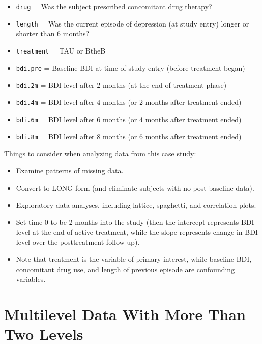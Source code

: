 \documentclass[
]{krantz}
\providecommand{\tightlist}{%
  \setlength{\itemsep}{0pt}\setlength{\parskip}{0pt}}
\begin{document}
\begin{enumerate}
  \begin{itemize}
  \tightlist
  \item
    \texttt{drug} = Was the subject prescribed concomitant drug therapy?
  \item
    \texttt{length} = Was the current episode of depression (at study entry) longer or shorter than 6 months?
  \item
    \texttt{treatment} = TAU or BtheB
  \item
    \texttt{bdi.pre} = Baseline BDI at time of study entry (before treatment began)
  \item
    \texttt{bdi.2m} = BDI level after 2 months (at the end of treatment phase)
  \item
    \texttt{bdi.4m} = BDI level after 4 months (or 2 months after treatment ended)
  \item
    \texttt{bdi.6m} = BDI level after 6 months (or 4 months after treatment ended)
  \item
    \texttt{bdi.8m} = BDI level after 8 months (or 6 months after treatment ended)
  \end{itemize}

  Things to consider when analyzing data from this case study:

  \begin{itemize}
  \tightlist
  \item
    Examine patterns of missing data.
  \item
    Convert to LONG form (and eliminate subjects with no post-baseline data).
  \item
    Exploratory data analyses, including lattice, spaghetti, and correlation plots.
  \item
    Set time 0 to be 2 months into the study (then the intercept represents BDI level at the end of active treatment, while the slope represents change in BDI level over the posttreatment follow-up).
  \item
    Note that treatment is the variable of primary interest, while baseline BDI, concomitant drug use, and length of previous episode are confounding variables.
  \end{itemize}
\end{enumerate}

\hypertarget{ch-3level}{%
\chapter{Multilevel Data With More Than Two Levels}\label{ch-3level}}
\end{document}
